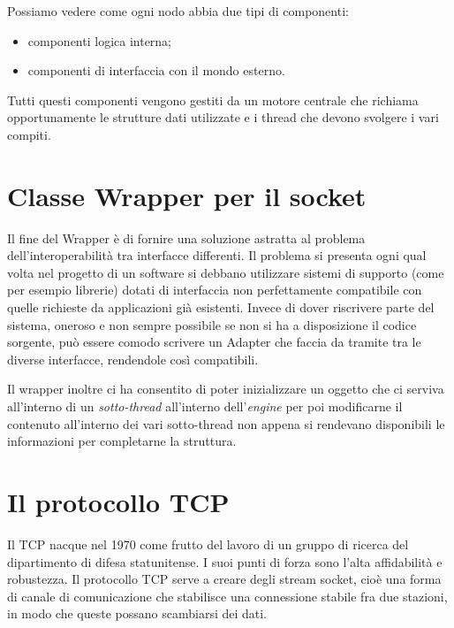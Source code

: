 Possiamo vedere come ogni nodo abbia due tipi di componenti:
\begin{itemize}
 \item componenti logica interna;
 \item componenti di interfaccia con il mondo esterno.
\end{itemize}

Tutti questi componenti vengono gestiti da un motore centrale che richiama opportunamente le strutture dati utilizzate e i thread che devono svolgere i vari compiti.


\section{Classe Wrapper per il socket}\label{sec:wrap_sock}
Il fine del Wrapper è di fornire una soluzione astratta al problema dell'interoperabilità tra interfacce differenti. Il problema si presenta ogni qual volta nel progetto di un software si debbano utilizzare sistemi di supporto (come per esempio librerie) dotati di interfaccia non perfettamente compatibile con quelle richieste da applicazioni già esistenti. Invece di dover riscrivere parte del sistema, oneroso e non sempre possibile se non si ha a disposizione il codice sorgente, può essere comodo scrivere un Adapter che faccia da tramite tra le diverse interfacce, rendendole così compatibili.

Il wrapper inoltre ci ha consentito di poter inizializzare un oggetto che ci serviva all'interno di un \emph{sotto-thread} all'interno dell'\emph{engine} per poi modificarne il contenuto all'interno dei vari sotto-thread non appena si rendevano disponibili le informazioni per completarne la struttura.


\section{Il protocollo  TCP}
Il TCP nacque nel 1970 come frutto del lavoro di un gruppo di ricerca del dipartimento di difesa statunitense. I suoi punti di forza sono l'alta affidabilità e robustezza.
Il protocollo TCP serve a creare degli stream socket, cioè una forma di canale di comunicazione che stabilisce una connessione stabile fra due stazioni, in modo che queste possano scambiarsi dei dati.

